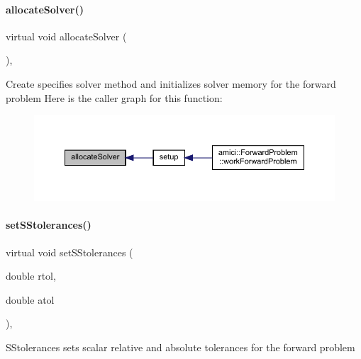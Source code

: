 \paragraph{\texorpdfstring{allocate\+Solver()}{allocateSolver()}}
{\footnotesize\ttfamily virtual void allocate\+Solver (\begin{DoxyParamCaption}{ }\end{DoxyParamCaption})\hspace{0.3cm}{\ttfamily [protected]}, {}}

Create specifies solver method and initializes solver memory for the forward problem Here is the caller graph for this function\+:
\nopagebreak
\begin{figure}[H]
\begin{center}
\leavevmode
\includegraphics[width=350pt]{classamici_1_1_solver_a0ae4930d2f6fa37ebcc55e334012fd6d_icgraph}
\end{center}
\end{figure}
\mbox{\label{classamici_1_1_solver_a6a688afa51ec71eded6c8801faaafac3}} 
\paragraph{\texorpdfstring{set\+S\+Stolerances()}{setSStolerances()}}
{\footnotesize\ttfamily virtual void set\+S\+Stolerances (\begin{DoxyParamCaption}\item[{double}]{rtol,  }\item[{double}]{atol }\end{DoxyParamCaption})\hspace{0.3cm}{\ttfamily [protected]}, {}}

S\+Stolerances sets scalar relative and absolute tolerances for the forward problem


